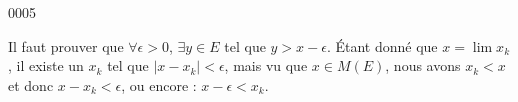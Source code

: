 
\begin{corrige}{0005}

Il faut prouver que $\forall\epsilon>0$, $\exists y\in E$ tel que $y>x-\epsilon$. Étant donné que $x=\lim x_k$, il existe un $x_k$ tel que $| x-x_k |<\epsilon$, mais vu que $x\in M(E)$, nous avons $x_k<x$ et donc $x-x_k<\epsilon$, ou encore : $x-\epsilon<x_k$.

\end{corrige}
